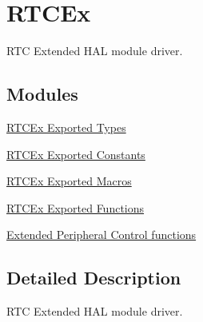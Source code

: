 \hypertarget{group___r_t_c_ex}{}\section{R\+T\+C\+Ex}
\label{group___r_t_c_ex}


R\+TC Extended H\+AL module driver.  


\subsection*{Modules}
\begin{DoxyCompactItemize}
\item 
\hyperlink{group___r_t_c_ex___exported___types}{R\+T\+C\+Ex Exported Types}
\item 
\hyperlink{group___r_t_c_ex___exported___constants}{R\+T\+C\+Ex Exported Constants}
\item 
\hyperlink{group___r_t_c_ex___exported___macros}{R\+T\+C\+Ex Exported Macros}
\item 
\hyperlink{group___r_t_c_ex___exported___functions}{R\+T\+C\+Ex Exported Functions}
\item 
\hyperlink{group___r_t_c_ex___exported___functions___group3}{Extended Peripheral Control functions}
\end{DoxyCompactItemize}


\subsection{Detailed Description}
R\+TC Extended H\+AL module driver. 

